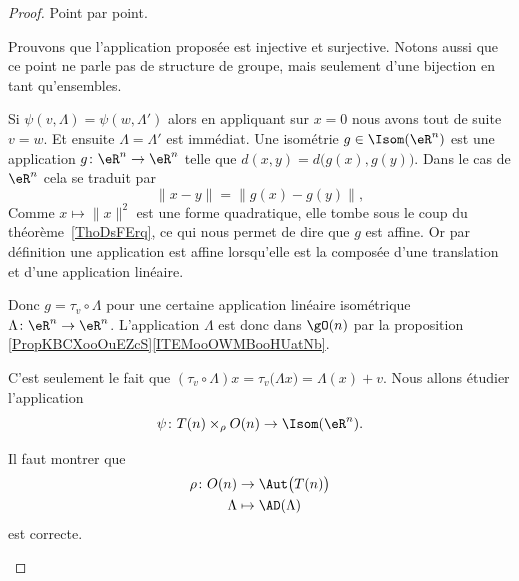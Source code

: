 \begin{proof}
	Point par point.
	\begin{subproof}
		Prouvons que l'application proposée est injective et surjective. Notons aussi que ce point ne parle pas de structure de groupe, mais seulement d'une bijection en tant qu'ensembles.
		\begin{subproof}
			\spitem[Injection]
			Si \( \psi(v,\Lambda)=\psi(w,\Lambda')\) alors en appliquant sur \( x=0\) nous avons tout de suite \( v=w\). Et ensuite \( \Lambda=\Lambda'\) est immédiat.
			\spitem[Surjection]
			Une isométrie \( g\in\Isom(\eR^n)\) est une application \( g\colon \eR^n\to \eR^n\) telle que \( d(x,y)=d\big( g(x),g(y) \big)\). Dans le cas de \( \eR^n\) cela se traduit par
			\begin{equation}
				\| x-y \|=\big\| g(x)-g(y) \big\|,
			\end{equation}
			Comme \( x\mapsto\| x \|^2\) est une forme quadratique, elle tombe sous le coup du théorème~\ref{ThoDsFErq}, ce qui nous permet de dire que \( g\) est affine. Or par définition une application est affine lorsqu'elle est la composée d'une translation et d'une application linéaire.

			Donc \( g=\tau_v\circ \Lambda\) pour une certaine application linéaire isométrique \( \Lambda\colon \eR^n\to \eR^n\). L'application \( \Lambda\) est donc dans \( \gO(n)\) par la proposition \ref{PropKBCXooOuEZcS}\ref{ITEMooOWMBooHUatNb}.
		\end{subproof}
		\spitem[Pour \ref{ITEMooBWQSooCJGPmC}]

		C'est seulement le fait que \( (\tau_v\circ\Lambda)x=\tau_v\big( \Lambda x \big)=\Lambda(x)+v\).
		\spitem[Pour \ref{ITEMooEWSIooNKzRxB}]
		Nous allons étudier l'application
		\begin{equation}
			\psi\colon T(n)\times_{\rho}O(n)\to \Isom(\eR^n).
		\end{equation}
		\begin{subproof}
			Il faut montrer que
			\begin{equation}
				\begin{aligned}
					\rho\colon O(n) & \to \Aut\big( T(n) \big) \\
					\Lambda         & \mapsto \AD(\Lambda)
				\end{aligned}
			\end{equation}
			est correcte.


\end{subproof}
\end{subproof}
\end{proof}
